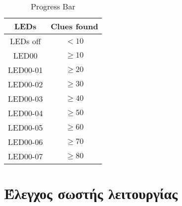 \documentclass[a4paper,12pt]{article}
\begin{document}
\begin{table}[h!]
\centering
\begin{tabular}[c]{| c | c |}
\hline
LEDs & Clues found \\
\hline
LEDs off & $< 10$ \\
\hline
LED00 &  $\geq 10$ \\
\hline
LED00-01 & $\geq 20$ \\
\hline
LED00-02 & $\geq 30$ \\
\hline
LED00-03 & $\geq 40$ \\
\hline
LED00-04 & $\geq 50$ \\
\hline
LED00-05 & $\geq 60$ \\
\hline
LED00-06 & $\geq 70$ \\
\hline
LED00-07 & $\geq 80$ \\
\hline
\end{tabular}
\caption{Progress Bar}
\label{table:progress_bar}
\end{table}






\section{Έλεγχος σωστής λειτουργίας}




\end{document}
